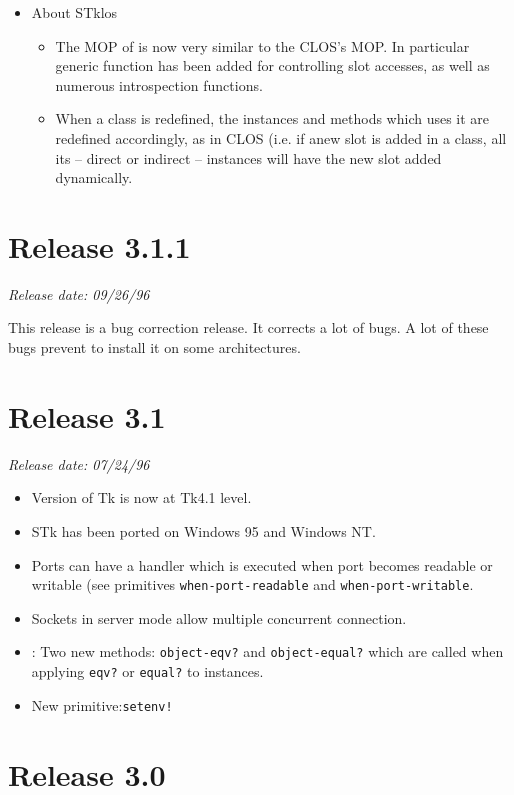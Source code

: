 \begin{itemize}
\item About STklos
  \begin{itemize}
  \item The MOP of {\stklos} is now very similar to the CLOS's MOP. In
    particular generic function has been added for controlling slot
    accesses, as well as numerous introspection functions.
  \item  When a class is redefined, the instances and methods which uses it
    are redefined accordingly, as in CLOS (i.e. if anew slot is added in a
    class, all its -- direct or indirect -- instances will have the new
    slot added dynamically. 
  \end{itemize}
\end{itemize}


\section*{Release 3.1.1}

\small{\emph{Release date: 09/26/96}}

This release is a bug correction release. It corrects a lot of bugs.
A lot of these bugs prevent to install it on some architectures.


\section*{Release 3.1}

\small{\emph{Release date: 07/24/96}}

\begin{itemize}
\item Version of Tk is now at Tk4.1 level.
\item STk has been ported on Windows 95 and Windows NT. 
\item Ports can have a handler which is executed when port becomes
  readable or writable (see primitives \texttt{when-port-readable} and
  \texttt{when-port-writable}.
\item Sockets in server mode allow multiple concurrent connection.
\item \stklos{}: Two new methods: \texttt{object-eqv?} and
  \texttt{object-equal?} which are called when applying \texttt{eqv?} 
  or \texttt{equal?} to instances.
\item New primitive:\texttt{setenv!}
  
\end{itemize}
\section*{Release 3.0} 


